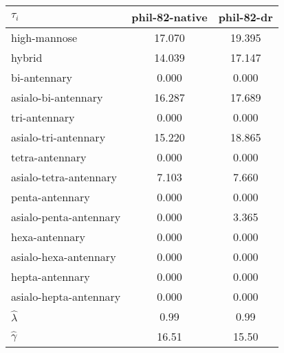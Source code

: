 \begin{table}
    \centering
    \small
    \begin{tabular}{l SS}
        \toprule
        $\tau_i$ & {phil-82-native} & {phil-82-dr}\\
        \midrule
        high-mannose & 17.070 & 19.395\\
        hybrid & 14.039 & 17.147\\
        bi-antennary & 0.000 & 0.000\\
        asialo-bi-antennary & 16.287 & 17.689\\
        tri-antennary & 0.000 & 0.000\\
        asialo-tri-antennary & 15.220 & 18.865\\
        tetra-antennary & 0.000 & 0.000\\
        asialo-tetra-antennary & 7.103 & 7.660\\
        penta-antennary & 0.000 & 0.000\\
        asialo-penta-antennary & 0.000 & 3.365\\
        hexa-antennary & 0.000 & 0.000\\
        asialo-hexa-antennary & 0.000 & 0.000\\
        hepta-antennary & 0.000 & 0.000\\
        asialo-hepta-antennary & 0.000 & 0.000\\
        \midrule
        ${\hat \lambda}$ & 0.99 & 0.99\\
        ${\hat \gamma}$ & 16.51 & 15.50\\
        \bottomrule
    \end{tabular}
\end{table}